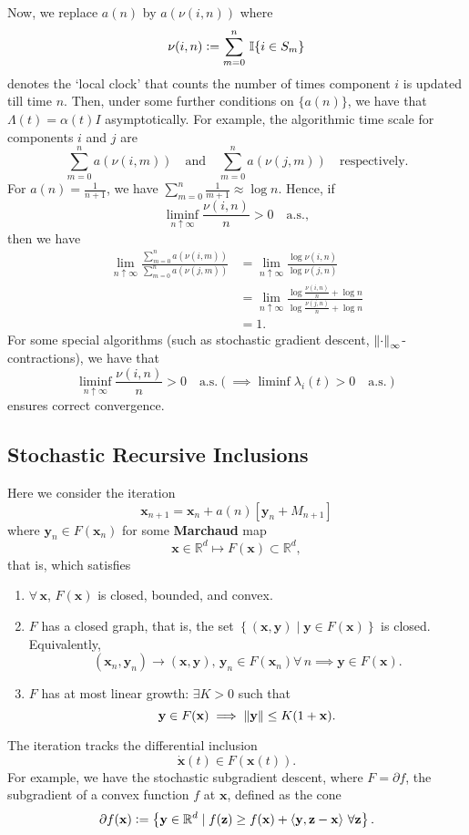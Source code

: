 Now, we replace $a(n)$ by $a(\nu(i,n))$ where
\[
    \nu(i,n) \vcentcolon= \sum_{m=0}^n\, \mathbb{I}\{i \in S_m\}
\]
denotes the `local clock' that counts the number of times component $i$ is updated till time $n$. Then, under some further conditions on $\{a(n)\}$, we have that $\Lambda(t) = \alpha(t) I$ asymptotically. For example, the algorithmic time scale for components $i$ and $j$ are
\[
    \sum_{m=0}^n a(\nu(i,m)) \quad \text{and} \quad \sum_{m=0}^n a(\nu(j,m)) \quad \text{respectively.}
\]
For $a(n) = \frac{1}{n+1}$, we have $\sum_{m=0}^n \frac{1}{m+1} \approx \log n$. Hence, if 
\[
    \liminf_{n \uparrow \infty} \frac{\nu(i,n)}{n} > 0 \quad \text{a.s.},
\]
then we have
\begin{align*}
    \lim_{n \uparrow \infty} \frac{\sum_{m=0}^n a(\nu(i,m))}{\sum_{m=0}^n a(\nu(j,m))} &= \lim_{n \uparrow \infty} \frac{\log \nu(i,n)}{\log \nu(j,n)} \\
    &= \lim_{n \uparrow \infty} \frac{\log \frac{\nu(i,n)}{n} + \log n}{\log \frac{\nu(j,n)}{n} + \log n} \\
    &= 1.
\end{align*}
For some special algorithms (such as stochastic gradient descent, $\norm{\cdot}_{\infty}$-contractions), we have that
\[
    \liminf_{n \uparrow \infty} \frac{\nu(i,n)}{n} > 0 \quad \text{a.s.} \left( \implies \liminf \lambda_i(t) > 0 \quad \text{a.s.} \right)
\]
ensures correct convergence. 

\subsection{Stochastic Recursive Inclusions}

Here we consider the iteration
\[
    \mathbf{x}_{n+1} = \mathbf{x}_n + a(n) \left[ \mathbf{y}_n + M_{n+1} \right]
\]
where $\mathbf{y}_n \in F(\mathbf{x}_n)$ for some \textbf{Marchaud} map 
\[
    \mathbf{x} \in \mathbb{R}^d \mapsto F(\mathbf{x}) \subset \mathbb{R}^d,
\]  
that is, which satisfies
\begin{enumerate}
    \item $\forall \, \mathbf{x}$, $F(\mathbf{x})$ is closed, bounded, and convex. 
    \item $F$ has a closed graph, that is, the set $\left\{ (\mathbf{x},\mathbf{y}) \mid\mathbf{y} \in F(\mathbf{x}) \right\}$ is closed. Equivalently, 
    \[
        (\mathbf{x}_n, \mathbf{y}_n) \to (\mathbf{x},\mathbf{y}), \, \mathbf{y}_n \in F(\mathbf{x}_n) \forall \, n \implies \mathbf{y} \in F(\mathbf{x}). 
    \]
    \item $F$ has at most linear growth: $\exists K > 0$ such that
    \[
        \mathbf{y} \in F(\mathbf{x}) \implies \norm{\mathbf{y}} \leq K(1 + \mathbf{x}). 
    \]
\end{enumerate}

The iteration tracks the differential inclusion
\[
    \dot{\mathbf{x}}(t) \in F(\mathbf{x}(t)).
\]
For example,  we have the stochastic subgradient descent, where $F = \partial f$, the subgradient of a convex function $f$ at $\mathbf{x}$, defined as the cone
\[
    \partial f(\mathbf{x}) \vcentcolon= \left\{ \mathbf{y} \in \mathbb{R}^d \mid f(\mathbf{z}) \geq f(\mathbf{x}) + \left\langle \mathbf{y}, \mathbf{z-x} \right\rangle \, \forall \mathbf{z} \right\}. 
\]